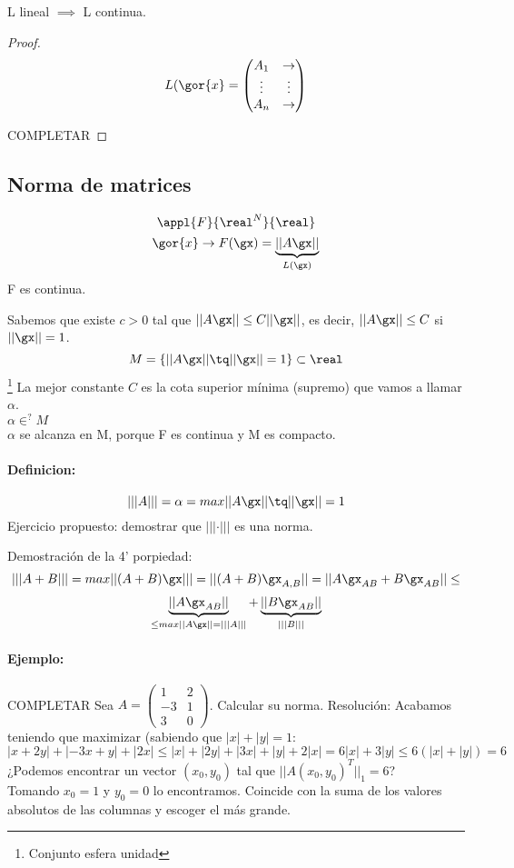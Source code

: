 \documentclass[a4paper,10pt]{apuntes}
\newcommand{\definition}[1]{\paragraph{Definicion: #1\\}}
\begin{document}
\begin{theorem}
 L lineal $\implies$ L continua.
\end{theorem}
\begin{proof}
 $$L(\gor{x} = \left(
 \begin{matrix}
  A_1 & \rightarrow \\
  \vdots & \vdots\\
  A_n & \rightarrow
 \end{matrix}\right)$$
 
 COMPLETAR

\end{proof}
\subsection{Norma de matrices}
$$\appl{F}{\real^N}{\real}$$
$$\gor{x} \rightarrow F(\gx) = \underbrace{||A\gx||}_{L(\gx)}$$
F es continua.

Sabemos que existe $c>0$ tal que $||A\gx|| \leq C||\gx||$, es decir,  $||A\gx||\leq C$ si $||\gx||=1$.
$$M = \{||A\gx|| \tq ||\gx||=1\}\subset \real$$\footnote{Conjunto esfera unidad}
La mejor constante $C$ es la cota superior mínima (supremo) que vamos a llamar $\alpha$.\\
$\alpha \in^{?} M$\\
$\alpha$ se alcanza en M, porque F es continua y M es compacto.

\definition{}
$$|||A||| = \alpha = max{||A\gx||\tq||\gx||=1}$$
Ejercicio propuesto: demostrar que $|||\cdot|||$ es una norma.

Demostración de la 4' porpiedad:
$$|||A+B||| = max{||(A+B)\gx|||} = ||(A+B)\gx_{A,B}|| = ||A\gx_{AB} + B\gx_{AB}|| \leq$$
$$
\underbrace{||A\gx_{AB}||}_{\leq max||A\gx|| =
|||A|||} + \underbrace{||B\gx_{AB}||}_{|||B|||} $$

\paragraph{Ejemplo:}COMPLETAR
Sea $A = \begin{pmatrix}
      1&2\\-3&1\\3&0
     \end{pmatrix}$. Calcular su norma.
Resolución:
Acabamos teniendo que maximizar (sabiendo que $|x|+|y| = 1$: $|x+2y| + |-3x+y| + |2x| \leq |x|+|2y| + |3x| + |y| + 2|x| = 6|x|+3|y| \leq 6 (|x|+|y|) =6$
¿Podemos encontrar un vector $(x_0,y_0)$ tal que $||A(x_0,y_0)^T||_1 = 6$?\\
Tomando $x_0 = 1$ y $y_0 = 0$ lo encontramos.
\obs Coincide con la suma de los valores absolutos de las columnas y escoger el más grande.
\end{document}
